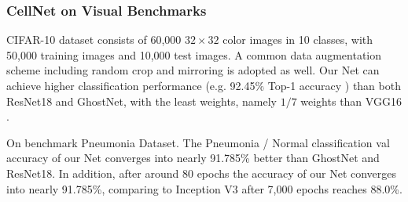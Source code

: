 \subsubsection{CellNet on Visual Benchmarks}




CIFAR-10 dataset\cite{21} consists of 60,000 $32 \times 32$ color images in 10 classes, with 50,000 training images and 10,000 test images. A common data augmentation scheme including random crop\cite{22} and mirroring\cite{19} is adopted as well. Our Net can achieve higher classification performance  (e.g.  92.45\%  Top-1  accuracy  ) than both ResNet18 and GhostNet, with the least  weights, namely $1/7$ weights than VGG16 \cite{23}. 


On benchmark Pneumonia Dataset\cite{38}. The Pneumonia / Normal classification val accuracy of our Net converges into nearly 91.785\% better than GhostNet and ResNet18. In addition, after around 80 epochs the accuracy of our Net converges into nearly 91.785\%, comparing to  Inception V3 after 7,000 epochs reaches 88.0\%\cite{38}.

